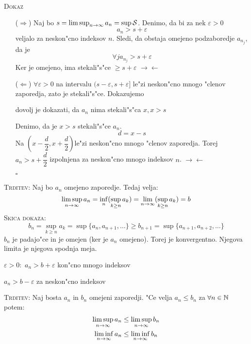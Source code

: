 \textsc{Dokaz}
\begin{itemize}
	\item[($\Rightarrow$)] Naj bo $s  = \limsup_{n \rightarrow \infty} a_n = \sup \mathcal{S}$. Denimo, da bi za nek $\varepsilon > 0$
	\begin{equation*}
	a_n > s + \varepsilon
	\end{equation*}
	veljalo za neskon"cno indeksov $n$. Sledi, da obstaja omejeno podzaboredje $a_{n_j}$, da je
	\begin{equation*}
	\forall j a_{n_j} > s + \varepsilon
	\end{equation*}
	Ker je omejeno, ima stekali"s"ce $\geq s+\varepsilon$ $\rightarrow \leftarrow$
	
	\item[($\Leftarrow$)] $\forall \varepsilon > 0$ na intervalu $(s-\varepsilon, s+\varepsilon]$ le"zi neskon"cno mnogo "clenov zaporedja, zato je stekali"s"ce. Dokazujemo 
	
	dovolj je dokazati, da $a_n$ nima stekali"s"ca $x, x > s$
	
	Denimo, da je $x > s$ stekali"s"ce $a_n$.
	\begin{equation*}
	d = x - s
	\end{equation*}
	Na $\left(x - \dfrac{d}{2}, x + \dfrac{d}{2}\right)$le"zi neskon"cno mnogo "clenov zaporedja. Torej $a_n > s + \dfrac{d}{2}$ izpolnjena za neskon"cno mnogo indeksov $n$. $\rightarrow \leftarrow$
	
	\hfill $\square$
\end{itemize}

\textsc{Trditev:} Naj bo $a_n$ omejeno zaporedje. Tedaj velja:
\begin{equation*}
\limsup_{n \rightarrow \infty} a_n = \inf_n (\sup_{k \geq n} a_k) = \lim_{n \rightarrow \infty} (\sup_{k \geq n} a_k) = b
\end{equation*}
\textsc{Skica dokaza:} \begin{equation*}
b_n = \sup_{k \geq n} a_k = \sup \{a_n, a_{n+1}, \ldots\} \geq b_{n+1} = \sup \{a_{n+1}, a_{n+2}, \ldots\}
\end{equation*}
$b_n$ je padajo"ce in je omejen (ker je $a_n$ omejeno). Torej je konvergentno. Njegova limita je njegova spodnja meja.

$\varepsilon > 0:$ $a_n > b + \varepsilon$ kon"cno mnogo indeksov

$a_n > b-\varepsilon$ za neskon"cno indeksov

\textsc{Trditev:} Naj bosta $a_n$ in $b_n$ omejeni zaporedji. "Ce velja $a_n \leq b_n$ za $\forall n \in \mathbb{N}$ potem:
\begin{gather*}
\limsup_{n \rightarrow \infty} a_n \leq \limsup_{n \rightarrow \infty} b_n \\
\liminf_{n \rightarrow \infty} a_n \leq \liminf_{n \rightarrow \infty} b_n
\end{gather*}

